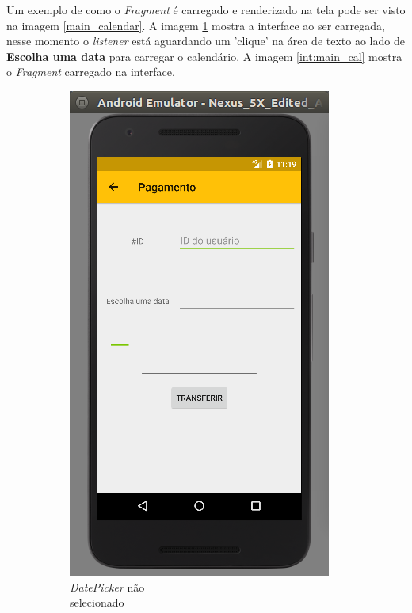 \documentclass[hidelinks,12pt]{article}
\begin{document}
Um exemplo de como o \textit{Fragment} \'e carregado e renderizado na tela pode ser visto na imagem \ref{main_calendar}. A imagem \ref{int:main_nocal} mostra a interface ao ser carregada, nesse momento o \textit{listener} est\'a aguardando um 'clique' na \'area de texto ao lado de \textbf{Escolha uma data} para carregar o calendário. A imagem \ref{int:main_cal} mostra o \textit{Fragment} carregado na interface.
\begin{figure}[H]
	\begin{subfigure}{0.5\textwidth}
		\includegraphics[scale=0.5]{int:main_nocal}
		\caption{\textit{DatePicker} n\~ao\\\hspace{\textwidth}selecionado}
		\label{int:main_nocal}
	\end{subfigure}
	\begin{subfigure}{0.5\textwidth}

\end{subfigure}
\end{figure}
\end{document}
